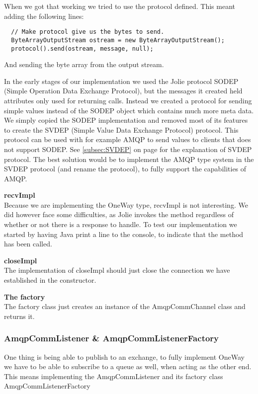 When we got that working we tried to use the protocol defined. This meant adding the following lines:
\begin{lstlisting}
  // Make protocol give us the bytes to send.
  ByteArrayOutputStream ostream = new ByteArrayOutputStream();
  protocol().send(ostream, message, null);
\end{lstlisting}
And sending the byte array from the output stream.

In the early stages of our implementation we used the Jolie protocol SODEP (Simple Operation Data Exchange Protocol)\cite{SODEP}, but the messages it created held attributes only used for returning calls. Instead we created a protocol for sending simple values instead of the SODEP object which contains much more meta data. We simply copied the SODEP implementation and removed most of its features to create the SVDEP (Simple Value Data Exchange Protocol) protocol. This protocol can be used with for example AMQP to send values to clients that does not support SODEP. See \ref{subsec:SVDEP} on page \pageref{subsec:SVDEP} for the explanation of SVDEP protocol. The best solution would be to implement the AMQP type system in the SVDEP protocol (and rename the protocol), to fully support the capabilities of AMQP.

\noindent\textbf{recvImpl}\\
Because we are implementing the OneWay type, recvImpl is not interesting. We did however face some difficulties, as Jolie invokes the method regardless of whether or not there is a response to handle. To test our implementation we started by having Java print a line to the console, to indicate that the method has been called.

\noindent\textbf{closeImpl}\\
The implementation of closeImpl should just close the connection we have established in the constructor.

\noindent\textbf{The factory}\\
The factory class just creates an instance of the AmqpCommChannel class and returns it.

\subsubsection{AmqpCommListener \& AmqpCommListenerFactory}
One thing is being able to publish to an exchange, to fully implement OneWay we have to be able to subscribe to a queue as well, when acting as the other end. This means implementing the AmqpCommListener and its factory class AmqpCommListenerFactory

